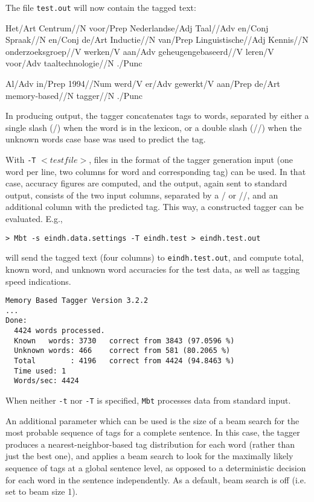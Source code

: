 \documentclass{report}
\begin{document}
The file {\tt test.out} will now contain the tagged text:

{\small 

Het/Art Centrum//N voor/Prep Nederlandse/Adj Taal//Adv en/Conj
Spraak//N en/Conj de/Art Inductie//N van/Prep Linguistische//Adj
Kennis//N onderzoeksgroep//V werken/V aan/Adv geheugengebaseerd//V
leren/V voor/Adv taaltechnologie//N ./Punc

Al/Adv in/Prep 1994//Num werd/V er/Adv gewerkt/V aan/Prep de/Art memory-based//N tagger//N ./Punc  
}

In producing output, the tagger concatenates tags to words,
separated by either a single slash (/) when the word is in the
lexicon, or a double slash (//) when the unknown words case base was
used to predict the tag.

With {\tt -T} $<testfile>$, files in the format of the tagger generation
input (one word per line, two columns for word and corresponding tag)
can be used. In that case, accuracy figures are computed, and the
output, again sent to standard output, consists of the two input
columns, separated by a / or //, and an additional column with the
predicted tag. This way, a constructed tagger can be evaluated. E.g., 

{\small
\begin{verbatim}
> Mbt -s eindh.data.settings -T eindh.test > eindh.test.out
\end{verbatim}
}

will send the tagged text (four columns) to {\tt eindh.test.out},
and compute total, known word, and unknown word accuracies for the
test data, as well as tagging speed indications.

{\small
\begin{verbatim}
Memory Based Tagger Version 3.2.2
...
Done:
  4424 words processed.
  Known   words: 3730   correct from 3843 (97.0596 %)
  Unknown words: 466    correct from 581 (80.2065 %)
  Total        : 4196   correct from 4424 (94.8463 %)
  Time used: 1
  Words/sec: 4424
\end{verbatim}
}

When neither {\tt -t} nor {\tt -T} is specified, {\tt Mbt} processes data from
standard input.

An additional parameter which can be used is the size of a beam search
for the most probable sequence of tags for a complete sentence. In
this case, the tagger produces a nearest-neighbor-based tag
distribution for each word (rather than just the best one), and
applies a beam search to look for the maximally likely sequence of tags
at a global sentence level, as opposed to a deterministic decision for
each word in the sentence independently. As a default, beam search is
off (i.e. set to beam size 1).
\end{document}
